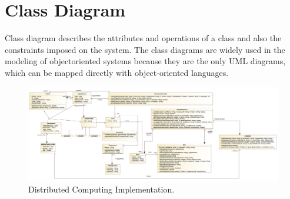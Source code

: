 \documentclass{article}
\begin{document}
            \section{Class Diagram} %
            Class diagram describes the attributes and operations of a class and also the constraints 
            imposed on the system. The class diagrams are widely used in the modeling of objectoriented 
            systems because they are the only UML diagrams, which can be mapped directly with object-oriented languages.
            \begin{figure}[H]
                \centering 
                \includegraphics[width=1\linewidth]{./img/class.png}
                \caption{Distributed Computing Implementation.}
                \label{fig:architecture}
            \end{figure}
\end{document}
